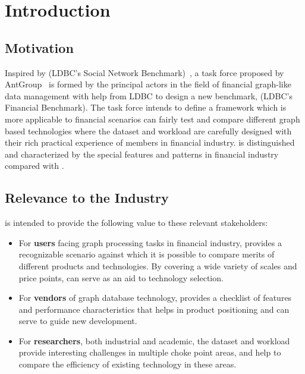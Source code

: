 \chapter{Introduction}
\label{sec:introduction}


\section{Motivation}

Inspired by \ldbcsnb(LDBC's Social Network Benchmark)~\cite{DBLP:journals/corr/abs-2001-02299,
ldbc_snb_docs}, a task force proposed by AntGroup~\cite{antgroup} is formed by the principal
actors in the field of financial graph-like data management with help from LDBC to design a
new benchmark, \ldbcfinbench(LDBC's Financial Benchmark). The task force intends to define a
framework which is more applicable to financial scenarios can fairly test and compare different
graph based technologies where the dataset and workload are carefully designed with their rich
practical experience of members in financial industry. \ldbcfinbench is distinguished and 
characterized by the special features and patterns in financial industry compared with \ldbcsnb.


\section{Relevance to the Industry}

\ldbcfinbench is intended to provide the following value to these relevant
stakeholders:

\begin{itemize}
 \item For \textbf{users} facing graph processing tasks in financial industry,
     \ldbcfinbench provides a recognizable scenario against which it is possible
     to compare merits of different products and technologies. By covering a wide
     variety of scales and price points, \ldbcfinbench can serve as an aid to
     technology selection.
 \item For \textbf{vendors} of graph database technology, \ldbcfinbench provides a
     checklist of features and performance characteristics that helps in product
     positioning and can serve to guide new development.
 \item For \textbf{researchers}, both industrial and academic, the \ldbcfinbench
     dataset and workload provide interesting challenges in multiple choke point
     areas, and help to compare the efficiency of existing technology in these
     areas.
\end{itemize}

